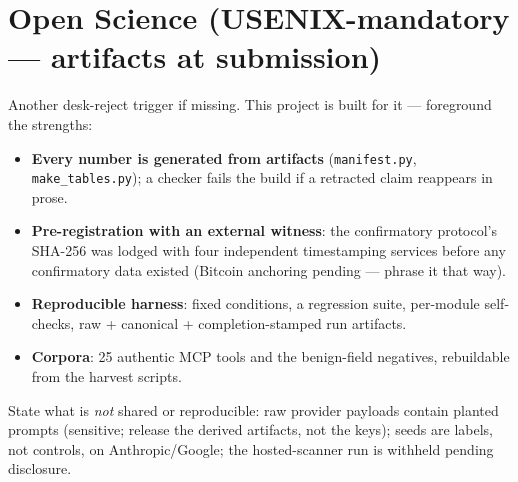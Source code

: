 \documentclass[11pt]{article}
\begin{document}
\section{Open Science \normalfont\small(USENIX-mandatory --- artifacts at submission)}
\begin{saybox}
Another desk-reject trigger if missing. This project is built for it --- foreground the strengths:
\begin{itemize}
  \item \textbf{Every number is generated from artifacts} (\texttt{manifest.py}, \texttt{make\_tables.py}); a checker fails the build if a retracted claim reappears in prose.
  \item \textbf{Pre-registration with an external witness}: the confirmatory protocol's SHA-256 was lodged with four independent timestamping services before any confirmatory data existed (Bitcoin anchoring pending --- phrase it that way).
  \item \textbf{Reproducible harness}: fixed conditions, a regression suite, per-module self-checks, raw + canonical + completion-stamped run artifacts.
  \item \textbf{Corpora}: 25 authentic MCP tools and the benign-field negatives, rebuildable from the harvest scripts.
\end{itemize}
\end{saybox}
\begin{hidebox}
State what is \emph{not} shared or reproducible: raw provider payloads contain planted prompts (sensitive; release the derived artifacts, not the keys); seeds are labels, not controls, on Anthropic/Google; the hosted-scanner run is withheld pending disclosure.
\end{hidebox}

\end{document}
